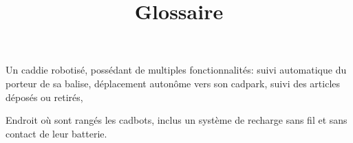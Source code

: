 \title{Glossaire}

Un caddie robotisé, possédant de multiples fonctionnalités: suivi automatique du porteur de sa balise, déplacement autonôme vers son cadpark, suivi des articles déposés ou retirés, \etc
\par

Endroit où sont rangés les cadbots, inclus un système de recharge sans fil et sans contact de leur batterie.
\par
